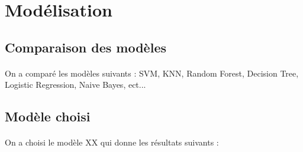 \documentclass[11pt,a4paper]{article}
\begin{document}
\section{Modélisation}

\subsection{Comparaison des modèles}

\paragraph{} On a comparé les modèles suivants : SVM, KNN, Random Forest, Decision Tree, Logistic Regression, Naive Bayes, ect...

\subsection{Modèle choisi}

\paragraph{} On a choisi le modèle XX qui donne les résultats suivants :
\end{document}
